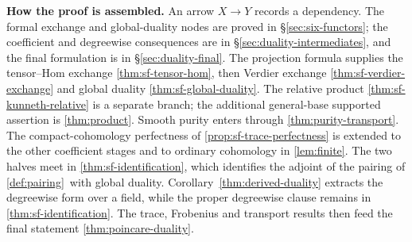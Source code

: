 \documentclass[11pt]{article}
\theoremstyle{plain}
\theoremstyle{definition}
\newcommand{\Cref}[1]{\hyperref[#1]{\ref{#1}}\,\hyperref[#1]{\nameref*{#1}}}
\begin{document}
\begin{center}
{}
\end{center}
\vspace{-0.4em}
\begin{center}
\footnotesize
\textbf{How the proof is assembled.}  An arrow \(X\to Y\) records a
dependency.  The formal exchange and global-duality nodes are proved in
\S\ref{sec:six-functors}; the coefficient and degreewise consequences are
in \S\ref{sec:duality-intermediates}, and the final formulation is in
\S\ref{sec:duality-final}.
The projection formula supplies the tensor--Hom exchange
\ref{thm:sf-tensor-hom}, then Verdier exchange
\ref{thm:sf-verdier-exchange} and global duality
\ref{thm:sf-global-duality}.
The relative product \ref{thm:sf-kunneth-relative} is a separate branch;
the additional general-base supported assertion is \ref{thm:product}.
Smooth purity enters through \ref{thm:purity-transport}.
The compact-cohomology perfectness of \ref{prop:sf-trace-perfectness}
is extended to the other coefficient stages and to ordinary cohomology
in \ref{lem:finite}.
The two halves meet in \ref{thm:sf-identification}, which identifies the
adjoint of the pairing of \Cref{def:pairing} with global duality.
Corollary~\ref{thm:derived-duality} extracts the degreewise form over a
field, while the proper degreewise clause remains in
\ref{thm:sf-identification}.  The trace, Frobenius and transport results
then feed the final statement \ref{thm:poincare-duality}.
\end{center}
\end{document}
